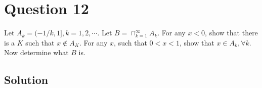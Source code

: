 \section*{Question 12}

Let \(A_{k}=(-1 / k, 1 ], k=1,2, \cdots \).
Let \(B=\cap_{k=1}^{\infty} A_{k}\).
For any \(x<0\), show that there is a \(K\) such that \(x \notin A_{K}\).
For any \(x\), such that \(0<x<1\), show that \(x \in A_{k}, \forall k\).
Now determine what \(B\) is.

\subsection*{Solution}
